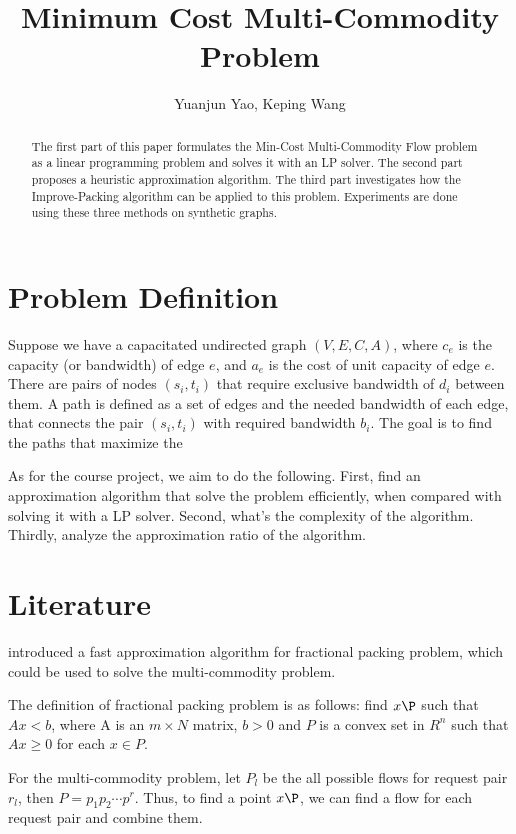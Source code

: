 \documentclass[a4paper]{article}
\title{Minimum Cost Multi-Commodity Problem}
\author{Yuanjun Yao, Keping Wang}
\begin{document}
\maketitle

\begin{abstract}
The first part of this paper formulates the Min-Cost Multi-Commodity Flow problem as a linear programming problem and solves it with an LP solver. The second part proposes a heuristic approximation algorithm. The third part investigates how the Improve-Packing algorithm can be applied to this problem. Experiments are done using these three methods on synthetic graphs.
\end{abstract}

\section{Problem Definition}

Suppose we have a capacitated  undirected graph $(V, E, C,A)$,
where $c_e$ is the capacity (or bandwidth) of edge $e$, and $a_e$ is the cost of unit capacity of edge $e$. There are pairs of nodes $(s_i,t_i)$ that require exclusive bandwidth of $d_i$ between them. A path is defined as a set of edges and the needed bandwidth of each edge, that connects the pair $(s_i,t_i)$ with required bandwidth $b_i$. The goal is to find the paths that maximize the 

As for the course project, we aim to do the following. First, find an approximation algorithm that solve the problem efficiently, when compared with solving it with a LP solver. Second, what's the complexity of the algorithm. Thirdly, analyze the approximation ratio of the algorithm.

\section{Literature}
\cite{plotkin1995fast} introduced a fast approximation algorithm for fractional packing problem, which could be used to solve the multi-commodity problem. 

The definition of fractional packing problem is as follows: find $x\P$ such that $Ax<b$, where A is an $m\times N$ matrix, $b>0$ and $P$ is a convex set in $R^n$ such that $Ax\geq 0$ for each $x\in P$.

For the multi-commodity problem, let $P_l$ be the all possible flows for request pair $r_l$, then $P=p_1 p_2\cdots p^r$. Thus, to find a point $x\P$, we can find a flow for each request pair and combine them.
\end{document}
